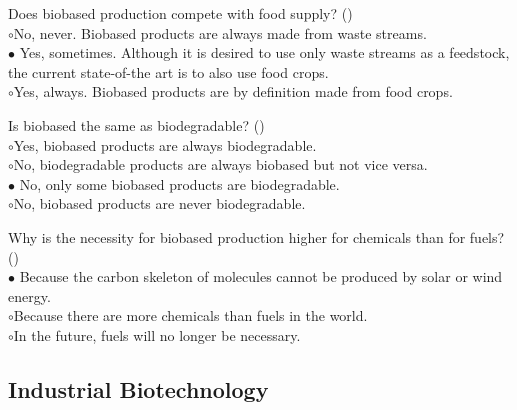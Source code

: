 \documentclass[]{beamer}
\begin{document}
\begin{CJK}{UTF8}{gbsn}
\begin{frame}[shrink] {} 
\addtocounter{questions}{1}
\color{blue}
  Does biobased production compete with food supply?
 ({})\\
\color{black}
\setlength{\parindent}{-0.4cm}
{\color{red}$\circ$}No, never. Biobased products are always made from waste streams.  \\
{\color{red}$\bullet$} Yes, sometimes. Although it is desired to use only waste streams as a feedstock, the current state-of-the art is to also use food crops.  \\
{\color{red}$\circ$}Yes, always. Biobased products are by definition made from food crops.  \\
\end{frame}


\begin{frame}[shrink] {} 
\addtocounter{questions}{1}
\color{blue}
  Is biobased the same as biodegradable?
 ({})\\
\color{black}
\setlength{\parindent}{-0.4cm}
{\color{red}$\circ$}Yes, biobased products are always biodegradable.  \\
{\color{red}$\circ$}No, biodegradable products are always biobased but not vice versa.  \\
{\color{red}$\bullet$} No, only some biobased products are biodegradable.  \\
{\color{red}$\circ$}No, biobased products are never biodegradable.  \\
\end{frame}


\begin{frame}[shrink] {} 
\addtocounter{questions}{1}
\color{blue}
  Why is the necessity for biobased production higher for chemicals than for fuels? 
 ({})\\
\color{black}
\setlength{\parindent}{-0.4cm}
{\color{red}$\bullet$} Because the carbon skeleton of molecules cannot be produced by solar or wind energy.   \\
{\color{red}$\circ$}Because there are more chemicals than fuels in the world.  \\
{\color{red}$\circ$}In the future, fuels will no longer be necessary.   \\
\end{frame}


\subsection{ Industrial Biotechnology}
\setcounter{questions}{0}



\end{CJK}
\end{document}
